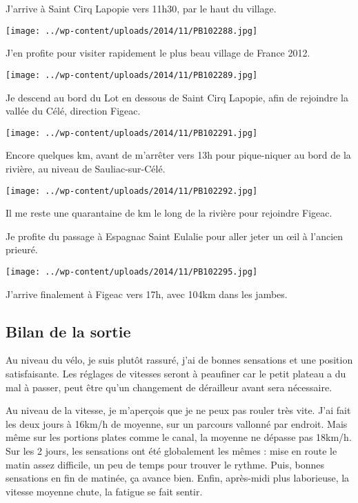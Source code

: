 J'arrive à Saint Cirq Lapopie vers 11h30, par le haut du village.

\begin{center} \texttt{[image: ../wp-content/uploads/2014/11/PB102288.jpg]} \end{center}

 J'en profite pour visiter rapidement le plus beau village de France 2012.
 
\begin{center} \texttt{[image: ../wp-content/uploads/2014/11/PB102289.jpg]} \end{center}

\pagebreak
 Je descend au bord du Lot en dessous de Saint Cirq Lapopie, afin de rejoindre la vallée du Célé, direction Figeac.
\begin{center} \texttt{[image: ../wp-content/uploads/2014/11/PB102291.jpg]} \end{center}

 Encore quelques km, avant de m'arrêter vers 13h pour pique-niquer au bord de la rivière, au niveau de Sauliac-sur-Célé.
\begin{center} \texttt{[image: ../wp-content/uploads/2014/11/PB102292.jpg]} \end{center}

 Il me reste une quarantaine de km le long de la rivière pour rejoindre Figeac.
 
 Je profite du passage à Espagnac Saint Eulalie pour aller jeter un œil à l'ancien prieuré.
\begin{center} \texttt{[image: ../wp-content/uploads/2014/11/PB102295.jpg]} \end{center}

 J'arrive finalement à Figeac vers 17h, avec 104km dans les jambes.
 
\subsection*{Bilan de la sortie}

 Au niveau du vélo, je suis plutôt rassuré, j'ai de bonnes sensations et une position satisfaisante. Les réglages de vitesses seront à peaufiner car le petit plateau a du mal à passer, peut être qu'un changement de dérailleur avant sera nécessaire.

 Au niveau de la vitesse, je m'aperçois que je ne peux pas rouler très vite. J'ai fait les deux jours à 16km/h de moyenne, sur un parcours vallonné par endroit. Mais même sur les portions plates comme le canal, la moyenne ne dépasse pas 18km/h. Sur les 2 jours, les sensations ont été globalement les mêmes : mise en route le matin assez difficile, un peu de temps pour trouver le rythme. Puis, bonnes sensations en fin de matinée, ça avance bien. Enfin, après-midi plus laborieuse, la vitesse moyenne chute, la fatigue se fait sentir.

